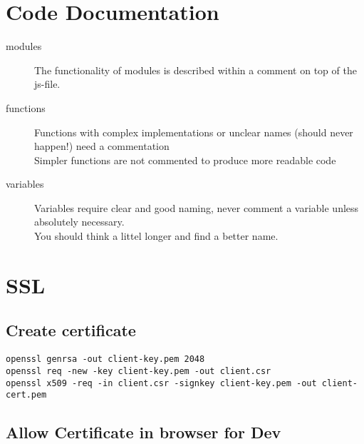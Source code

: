 \documentclass[10pt,a4paper,landscape]{article}
\begin{document}
\renewcommand{\labelitemi}{$\bullet$}
\renewcommand{\labelitemii}{$\cdot$}
\renewcommand{\labelitemiii}{$\diamond$}
\renewcommand{\labelitemiv}{$\ast$}

\section{Code Documentation}
\begin{description}
        \item[modules]
            The functionality of modules is described within a comment on top of the js-file.\\
        \item[functions]
            Functions with complex implementations or unclear names (should never happen!) need a commentation\\
            Simpler functions are not commented to produce more readable code\\
        \item[variables]
            Variables require clear and good naming, never comment a variable unless absolutely necessary.\\ 
            You should think a littel longer and find a better name.\\
\end{description}
\section{SSL}
\subsection{Create certificate}
\begin{lstlisting}
openssl genrsa -out client-key.pem 2048
openssl req -new -key client-key.pem -out client.csr
openssl x509 -req -in client.csr -signkey client-key.pem -out client-cert.pem
\end{lstlisting}
\subsection{Allow Certificate in browser for Dev}
\end{document}
